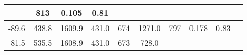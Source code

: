 \documentclass[a4paper,10pt]{article}
\begin{document}
\begin{longtable}{
     |
%    
    c|
%    
    c|
%    
    c|
%    
    c|
%    
    c|
%    
    c|
%    
    c|
%    
    c|
%    
    c|
%    
    c|
%    
    }
%        
        & 813
%        

%        

%        
        & 0.105
%        

%        

%        
        & 0.81
%        

%        
        \\
        \hline

        

%        

%        
        -89.6
%        

%        

%        
        & 438.8
%        

%        

%        
        & 1609.9
%        

%        

%        
        & 431.0
%        

%        

%        
        & 674
%        

%        

%        
        & 1271.0
%        

%        

%        
        & 797
%        

%        

%        
        & 0.178
%        

%        

%        
        & 0.83
%        

%        
        \\
        \hline

        

%        

%        
        -81.5
%        

%        

%        
        & 535.5
%        

%        

%        
        & 1608.9
%        

%        

%        
        & 431.0
%        

%        

%        
        & 673
%        

%        

%        
        & 728.0
%        

%        


\end{longtable}
\end{document}
